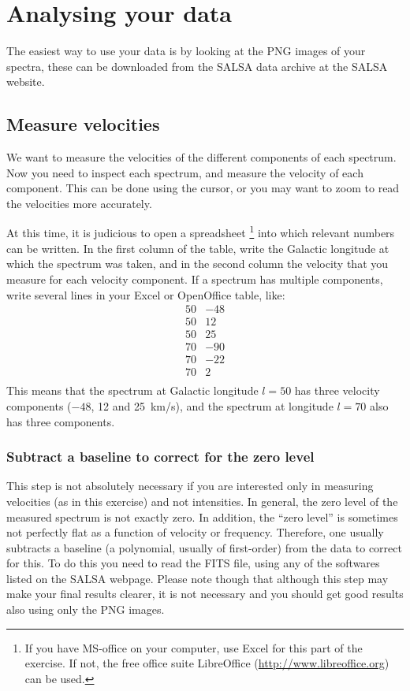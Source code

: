 \chapter{Analysing your data}
The easiest way to use your data is by looking at the PNG images of your
spectra, these can be downloaded from the SALSA data archive at the SALSA
website. 

\section{Measure velocities}
We want to measure the velocities of the different components of each spectrum.
Now you need to inspect each spectrum, and measure the velocity of each
component. This can be done using the cursor, or you may want to zoom to read
the velocities more accurately.  

At this time, it is judicious to open a spreadsheet \footnote{If you have
MS-office on your computer, use Excel for this part of the exercise. If not,
the free office suite LibreOffice (\url{http://www.libreoffice.org}) can be
used.} into which relevant numbers can be written. 
In the first column of the table, write the Galactic longitude at which the
spectrum was taken, and in the second column the velocity that you measure for
each velocity component.  If a spectrum has multiple components, write several
lines in your Excel or OpenOffice table, like:
\begin{displaymath}
\begin{array}{lr}
50 	&-48	\\
50 	& 12	\\
50	& 25	\\
70	&-90	\\
70	&-22	\\
70	&2	\\
\end{array}
\end{displaymath}
This means that the spectrum at Galactic longitude $l=50$ has three
velocity components ($-48$, 12 and 25~km/s), and the spectrum at
longitude $l=70$ also has three components.

\subsection{Subtract a baseline to correct for the zero level}
This step is not absolutely necessary if you are interested only in measuring
velocities (as in this exercise) and not intensities.  In general, the zero
level of the measured spectrum is not exactly zero. In addition, the ``zero
level'' is sometimes not perfectly flat as a function of velocity or frequency.
Therefore, one usually subtracts a baseline (a polynomial, usually of
first-order) from the data to correct for this.  To do this you need to read
the FITS file, using any of the softwares listed on the SALSA webpage.
Please note though that although this step may make your final results
clearer, it is not necessary and you should get good results also using
only the PNG images.

